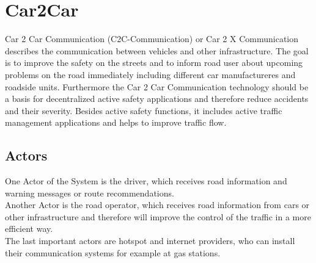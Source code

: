 \chapter{Car2Car}
\label{cha:Car2Car}
Car 2 Car Communication (C2C-Communication) or Car 2 X Communication describes the communication between vehicles and other infrastructure. The goal is to improve the safety on the streets and to inform road user about upcoming problems on the road immediately including different car manufactureres and roadside units. Furthermore the Car 2 Car Communication technology should be a basis for decentralized active safety applications and therefore reduce accidents and their severity. Besides active safety functions, it includes active traffic management applications and helps to improve traffic flow.

\section{Actors}
One Actor of the System is the driver, which receives road information and warning messages or route recommendations.\\
Another Actor is the road operator, which receives road information from cars or other infrastructure and therefore will improve the control of the traffic in a more efficient way.\\
The last important actors are hotspot and internet providers, who can install their communication systems for example at gas stations.